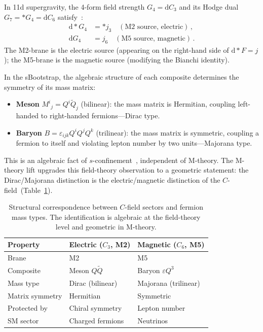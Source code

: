 \documentclass[aps,prd,twocolumn,showpacs,preprintnumbers,superscriptaddress,floatfix]{revtex4-2}
\newcommand{\dd}{\mathrm{d}}
\begin{document}
In 11d supergravity, the 4-form field strength
$G_4 = \dd C_3$ and its Hodge dual $G_7 = *G_4 = \dd C_6$
satisfy~\cite{CremmerJuliaScherk:1978,Townsend:1995}:
\begin{align}
  \dd * G_4 &= *j_3 \quad (\text{M2 source, electric})\,,
  \label{eq:M2source} \\
  \dd G_4 &= j_6 \quad
  (\text{M5 source, magnetic})\,.
  \label{eq:M5source}
\end{align}
The M2-brane is the electric source (appearing on the right-hand
side of $\dd*F = j$); the M5-brane is the magnetic source
(modifying the Bianchi identity).

In the sBootstrap, the algebraic structure of each composite
determines the symmetry of its mass matrix:
\begin{itemize}
\item \textbf{Meson} $M^i{}_j = Q^i\tilde{Q}_j$ (bilinear):
  the mass matrix is Hermitian, coupling left-handed to
  right-handed fermions---Dirac type.
\item \textbf{Baryon} $B = \varepsilon_{ijk}Q^iQ^jQ^k$ (trilinear):
  the mass matrix is symmetric, coupling a fermion to itself and
  violating lepton number by two units---Majorana type.
\end{itemize}
This is an algebraic fact of
$s$-confinement~\cite{Seiberg:1994bz,CsakiSchmaltzSkiba:1997},
independent of M-theory.
The M-theory lift upgrades this field-theory observation to a
geometric statement: the Dirac/Majorana distinction is the
electric/magnetic distinction of the
$C$-field~(Table~\ref{tab:duality}).

\begin{table}
\centering\small
\caption{Structural correspondence between $C$-field sectors and
  fermion mass types.  The identification is algebraic at the
  field-theory level and geometric in M-theory.}
\label{tab:duality}
\begin{tabular}{lll}
\toprule
Property & Electric ($C_3$, M2) & Magnetic ($C_6$, M5) \\
\midrule
Brane & M2 & M5 \\
Composite & Meson $Q\tilde{Q}$ & Baryon $\varepsilon Q^3$ \\
Mass type & Dirac (bilinear) & Majorana (trilinear) \\
Matrix symmetry & Hermitian & Symmetric \\
Protected by & Chiral symmetry & Lepton number \\
SM sector & Charged fermions & Neutrinos \\
\bottomrule
\end{tabular}
\end{table}
\end{document}
